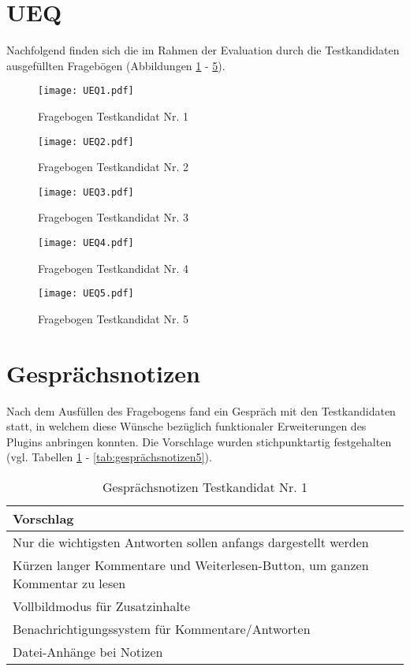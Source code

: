 \section{UEQ}
\label{sec:ueqs}

Nachfolgend finden sich die im Rahmen der Evaluation durch die Testkandidaten ausgefüllten Fragebögen (Abbildungen \ref{fig:UEQ1} - \ref{fig:UEQ5}).

\begin{figure}[h!]
\texttt{[image: UEQ1.pdf]}
\caption{\label{fig:UEQ1}Fragebogen Testkandidat Nr. 1}
\end{figure}
\begin{figure}[h!]
\texttt{[image: UEQ2.pdf]}
\caption{\label{fig:UEQ2}Fragebogen Testkandidat Nr. 2}
\end{figure}
\begin{figure}[h!]
\texttt{[image: UEQ3.pdf]}
\caption{\label{fig:UEQ3}Fragebogen Testkandidat Nr. 3}
\end{figure}
\begin{figure}[h!]
\texttt{[image: UEQ4.pdf]}
\caption{\label{fig:UEQ4}Fragebogen Testkandidat Nr. 4}
\end{figure}
\begin{figure}[h!]
\texttt{[image: UEQ5.pdf]}
\caption{\label{fig:UEQ5}Fragebogen Testkandidat Nr. 5}
\end{figure}

\FloatBarrier

\section{Gesprächsnotizen}
\label{sec:gesprächsnotizen}

Nach dem Ausfüllen des Fragebogens fand ein Gespräch mit den Testkandidaten statt, in welchem diese Wünsche bezüglich funktionaler Erweiterungen des Plugins anbringen konnten. Die Vorschlage wurden stichpunktartig festgehalten (vgl. Tabellen \ref{tab:gesprächsnotizen1} - \ref{tab:gesprächsnotizen5}).

\begin{table}[!ht]
\centering
\def\arraystretch{1.4}
\begin{tabularx}{\textwidth}{l}      
    \hline
	Vorschlag
	\\\hline
    Nur die wichtigsten Antworten sollen anfangs dargestellt werden \\
	Kürzen langer Kommentare und \glqq Weiterlesen\grqq{}-Button, um ganzen Kommentar zu lesen \\
	Vollbildmodus für Zusatzinhalte \\
	Benachrichtigungssystem für Kommentare/Antworten \\
	Datei-Anhänge bei Notizen \\
    \hline
    \end{tabularx}
    \caption{Gesprächsnotizen Testkandidat Nr. 1}
\label{tab:gesprächsnotizen1}
\end{table}

